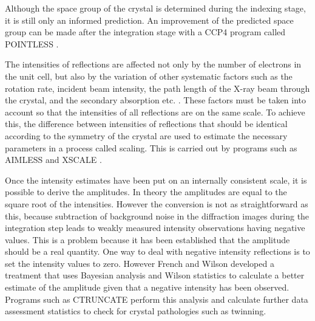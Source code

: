         Although the space group of the crystal is determined during the indexing stage, it is still only an informed prediction.
        An improvement of the predicted space group can be made after the integration stage with a CCP4 program called POINTLESS \cite{evans2011introduction}.

        The intensities of reflections are affected not only by the number of electrons in the unit cell, but also by the variation of other systematic factors such as the rotation rate, incident beam intensity, the path length of the X-ray beam through the crystal, and the secondary absorption etc. \cite{evans2005}.
        These factors must be taken into account so that the intensities of all reflections are on the same scale.
        To achieve this, the difference between intensities of reflections that should be identical according to the symmetry of the crystal are used to estimate the necessary parameters in a process called scaling.
        This is carried out by programs such as AIMLESS \cite{evans2013} and XSCALE \cite{kabsch2010}.

        Once the intensity estimates have been put on an internally consistent scale, it is possible to derive the amplitudes.
        In theory the amplitudes are equal to the square root of the intensities.
        However the conversion is not as straightforward as this, because subtraction of background noise in the diffraction images during the integration step leads to weakly measured intensity observations having negative values.
        This is a problem because it has been established that the amplitude should be a real quantity.
        One way to deal with negative intensity reflections is to set the intensity values to zero.
        However French and Wilson developed a treatment that uses Bayesian analysis \cite{french1978treatment} and Wilson statistics \cite{wilson1949probability} to calculate a better estimate of the amplitude given that a negative intensity has been observed.
        Programs such as CTRUNCATE \cite{evans2011introduction} perform this analysis and calculate further data assessment statistics to check for crystal pathologies such as twinning.

